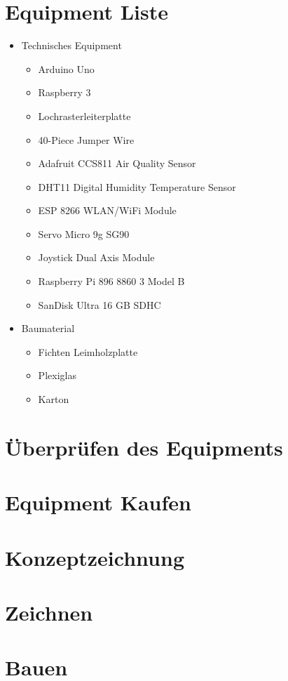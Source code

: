 \section{Equipment Liste}
\begin{itemize}
	\item Technisches Equipment
	\begin{itemize}
		\item Arduino Uno
		\item Raspberry 3
		\item Lochrasterleiterplatte
		\item 40-Piece Jumper Wire
		\item Adafruit CCS811 Air Quality Sensor
		\item DHT11 Digital Humidity Temperature Sensor
		\item ESP 8266 WLAN/WiFi Module
		\item Servo Micro 9g SG90
		\item Joystick Dual Axis Module
		\item Raspberry Pi 896 8860 3 Model B
		\item SanDisk Ultra 16 GB SDHC
	\end{itemize}
		\item Baumaterial
	\begin{itemize}
		\item Fichten Leimholzplatte
		\item Plexiglas
		\item Karton
	\end{itemize}
\end{itemize}

\section{Überprüfen des Equipments}

\section{Equipment Kaufen}
\section{Konzeptzeichnung}
\section{Zeichnen}
\section{Bauen}



